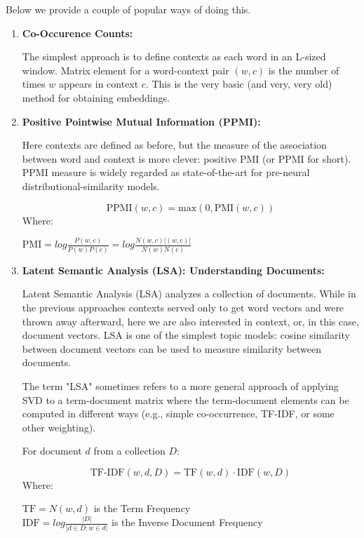 \documentclass{report}
\begin{document}
Below we provide a couple of popular ways of doing this.
\begin{enumerate}
	\item \textbf{Co-Occurence Counts:} 

The simplest approach is to define contexts as each word in an L-sized window. Matrix element for a word-context pair $(w, c)$ is the number of times $w$ appears in context $c$. This is the very basic (and very, very old) method for obtaining embeddings.

	\item \textbf{Positive Pointwise Mutual Information (PPMI):}

Here contexts are defined as before, but the measure of the association between word and context is more clever: positive PMI (or PPMI for short). PPMI measure is widely regarded as state-of-the-art for pre-neural distributional-similarity models.

$$\text{PPMI}(w,c) = \text{max}(0, \text{PMI}(w,c))$$
Where:

$\text{PMI} = log\frac{P(w,c)}{P(w) P(c)} = log\frac{N(w,c)|(w,c)|}{N(w) N(c)}$

\item \textbf{Latent Semantic Analysis (LSA): Understanding Documents:}

Latent Semantic Analysis (LSA) analyzes a collection of documents. While in the previous approaches contexts served only to get word vectors and were thrown away afterward, here we are also interested in context, or, in this case, document vectors. LSA is one of the simplest topic models: cosine similarity between document vectors can be used to measure similarity between documents.

The term "LSA" sometimes refers to a more general approach of applying SVD to a term-document matrix where the term-document elements can be computed in different ways (e.g., simple co-occurrence, TF-IDF, or some other weighting).

For document $d$ from a collection $D$:

$$\text{TF-IDF}(w,d,D) = \text{TF}(w,d)\cdot \text{IDF}(w,D)$$
Where:

$\text{TF} = N(w,d)$ is the Term Frequency\\
$\text{IDF} = log\frac{|D|}{|d \in D : w \in d|}$ is the Inverse Document Frequency

\end{enumerate}
\end{document}
